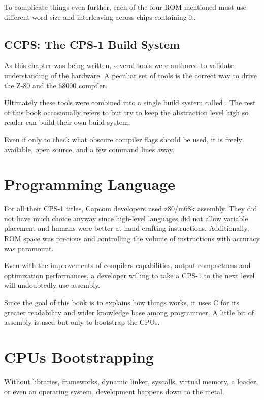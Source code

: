 To complicate things even further, each of the four ROM mentioned must use different word size and interleaving across chips containing it.

\subsection{CCPS: The CPS-1 Build System}
As this chapter was being written, several tools were authored to validate understanding of the hardware. A peculiar set of tools is the correct way to drive the Z-80 and the 68000 compiler. 

Ultimately these tools were combined into a single build system called . The rest of this book occasionally refers to  but try to keep the abstraction level high so reader can build their own build system. 

Even if only to check what obscure compiler flags should be used, it is freely available, open source, and a few command lines away.






\section{Programming Language}
For all their CPS-1 titles, Capcom developers used z80/m68k assembly. They did not have much choice anyway since high-level languages did not allow variable placement and humans were better at hand crafting instructions. Additionally, ROM space was precious and controlling the volume of instructions with accuracy was paramount.

Even with the improvements of compilers capabilities, output compactness and optimization performances, a developer willing to take a CPS-1 to the next level will undoubtedly use assembly.

Since the goal of this book is to explains how things works, it uses C for its greater readability and wider knowledge base among programmer. A little bit of assembly is used but only to bootstrap the CPUs.
	
\section{CPUs Bootstrapping}
Without libraries, frameworks, dynamic linker, syscalls, virtual memory, a loader, or even an operating system, development happens down to the metal. 

